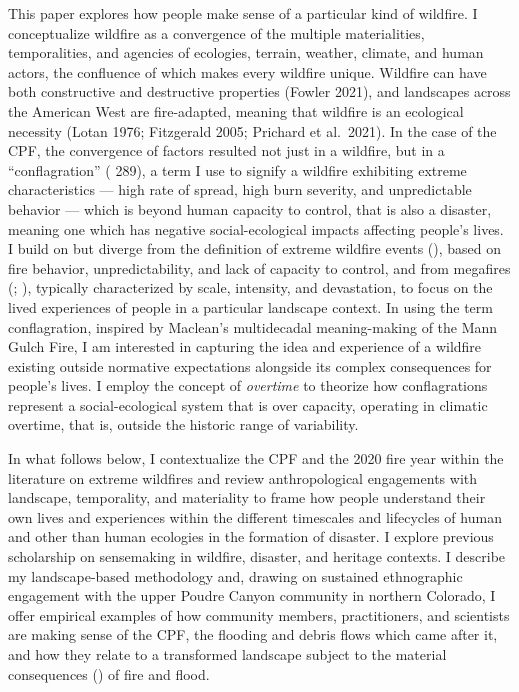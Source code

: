 \documentclass[
]{article}
\begin{document}
This paper explores how people make sense of a particular kind of wildfire. I conceptualize wildfire as a convergence of the multiple materialities, temporalities, and agencies of ecologies, terrain, weather, climate, and human actors, the confluence of which makes every wildfire unique. Wildfire can have both constructive and destructive properties (Fowler 2021), and landscapes across the American West are fire-adapted, meaning that wildfire is an ecological necessity (Lotan 1976; Fitzgerald 2005; Prichard et al.~2021). In the case of the CPF, the convergence of factors resulted not just in a wildfire, but in a ``conflagration'' ( 289), a term I use to signify a wildfire exhibiting extreme characteristics --- high rate of spread, high burn severity, and unpredictable behavior --- which is beyond human capacity to control, that is also a disaster, meaning one which has negative social-ecological impacts affecting people's lives. I build on but diverge from the definition of extreme wildfire events (), based on fire behavior, unpredictability, and lack of capacity to control, and from megafires (; ), typically characterized by scale, intensity, and devastation, to focus on the lived experiences of people in a particular landscape context. In using the term conflagration, inspired by Maclean's multidecadal meaning-making of the Mann Gulch Fire, I am interested in capturing the idea and experience of a wildfire existing outside normative expectations alongside its complex consequences for people's lives. I employ the concept of \emph{overtime} to theorize how conflagrations represent a social-ecological system that is over capacity, operating in climatic overtime, that is, outside the historic range of variability.

In what follows below, I contextualize the CPF and the 2020 fire year within the literature on extreme wildfires and review anthropological engagements with landscape, temporality, and materiality to frame how people understand their own lives and experiences within the different timescales and lifecycles of human and other than human ecologies in the formation of disaster. I explore previous scholarship on sensemaking in wildfire, disaster, and heritage contexts. I describe my landscape-based methodology and, drawing on sustained ethnographic engagement with the upper Poudre Canyon community in northern Colorado, I offer empirical examples of how community members, practitioners, and scientists are making sense of the CPF, the flooding and debris flows which came after it, and how they relate to a transformed landscape subject to the material consequences () of fire and flood.
\end{document}
